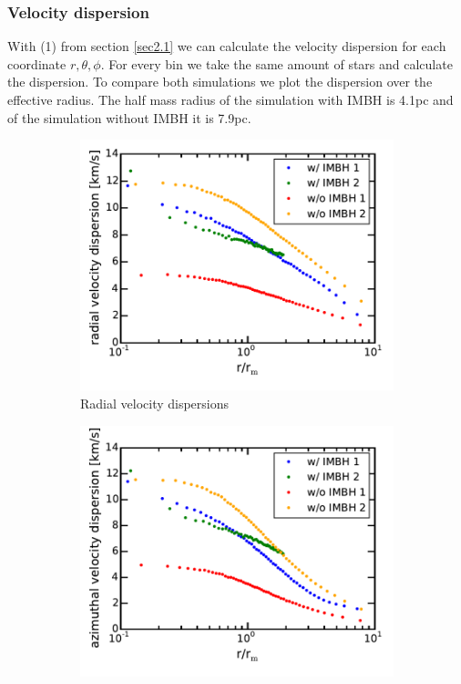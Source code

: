 \documentclass[a4paper,12pt,abstracton]{scrartcl}
\begin{document}
\subsubsection{Velocity dispersion}
With (1) from section \ref{sec2.1} we can calculate the velocity dispersion for each coordinate \(r,\theta,\phi\). For every bin we take the same amount of stars and calculate the dispersion. To compare both simulations we plot the dispersion over the effective radius. The half mass radius of the simulation with \ac{IMBH} is 4.1pc and of the simulation without \ac{IMBH} it is 7.9pc. 
\begin{figure}[htbp]
	\centering
	\begin{subfigure}{0.475\textwidth}
		\centering
		\includegraphics[width=\textwidth]{Plots/radial_velocity_dispersion.pdf}
		\caption{Radial velocity dispersions}
		\label{[fig:radial_vel_disp]}
	\end{subfigure}
	\hfill
	\begin{subfigure}{0.475\textwidth}
		\centering
		\includegraphics[width=\textwidth]{Plots/azimuthal_velocity_dispersion.pdf}

\end{subfigure}
\end{figure}
\end{document}
